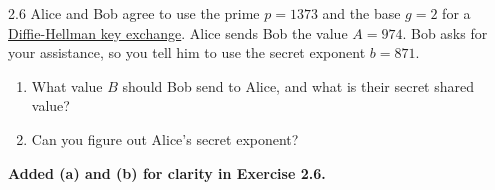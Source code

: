 
\begin{exercise}
    {2.6} Alice and Bob agree to use the prime \(p = 1373\) and the base \(g = 2\) for a \hyperlink{d-h key}{Diffie-Hellman key exchange}. Alice sends Bob the value \(A = 974\). Bob asks for your assistance, so you tell him to use the secret exponent \(b = 871\).
    \begin{enumerate}
        \item What value \(B\) should Bob send to Alice, and what is their secret shared value?
        \item Can you figure out Alice's secret exponent?
    \end{enumerate}
\end{exercise}

\begin{center}
    \textbf{Added (a) and (b) for clarity in Exercise 2.6.}
\end{center}


